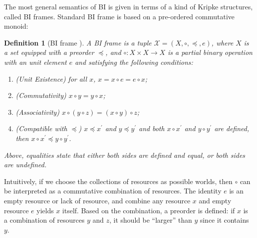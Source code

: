 \documentclass[conference,compsoc, 10pt]{IEEEtran}
\newtheorem{definition}{Definition}[section]
\newcommand {\cX } {{\mathcal{X}}}
\newcommand {\sepimp} {\mathrel{-\mkern-6mu*}}
\begin{document}
	The most general semantics of BI is given in terms of a kind of Kripke structures, called BI frames. Standard BI frame is based on a pre-ordered commutative monoid:
	\begin{definition}[BI frame \cite{OP99}]
		\label{def BI frame}
		A BI frame is a tuple $\cX = (X,\circ,\preceq,e)$, where $X$ is a set equipped with a preorder $\preceq$, and $\circ: X\times X\rightarrow X$ is a partial binary operation with an unit element $e$ and satisfying the following conditions:
		\begin{enumerate}
			\item (Unit Existence) for all $x$, $x =  x\circ e = e\circ x$;
			\item (Commutativity) $x\circ y = y\circ x$;
			\item (Associativity) $x\circ (y\circ z) = (x\circ y)\circ z$;
			\item (Compatible with $\preceq$) 
			$x\preceq x^\prime$ and $y\preceq y^\prime$ and both $x\circ x^\prime$ and $y\circ y^\prime$ are defined, then $x\circ x^\prime\preceq y\circ y^\prime$.
		\end{enumerate}
    Above, equalities state that either both sides are defined and equal, or both
    sides are undefined.
	\end{definition}
	
	Intuitively, if we choose the collections of resources as possible worlds, then $\circ$ can be interpreted as a commutative combination of resources. The identity $e$ is an empty resource or lack of resource, and combine any resource $x$ and empty resource $e$ yields $x$ itself. Based on the combination, a preorder is defined: if $x$ is a combination of resources $y$ and $z$, it should be ``larger'' than $y$ since it contains $y$. 
	
	
\end{document}
